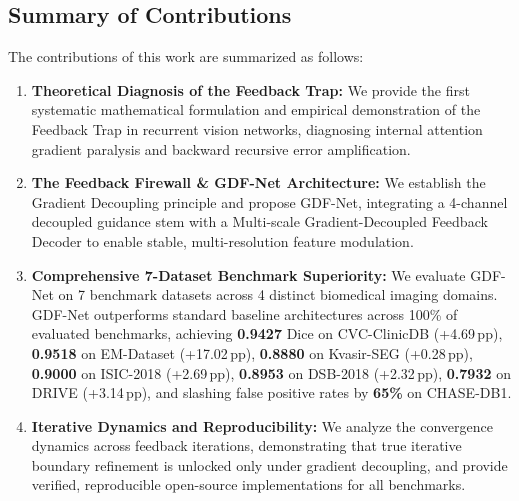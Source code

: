 \subsection{Summary of Contributions}
The contributions of this work are summarized as follows:
\begin{enumerate}
  \item \textbf{Theoretical Diagnosis of the Feedback Trap:} We provide the first systematic mathematical formulation and empirical demonstration of the Feedback Trap in recurrent vision networks, diagnosing internal attention gradient paralysis and backward recursive error amplification.
  \item \textbf{The Feedback Firewall \& GDF-Net Architecture:} We establish the Gradient Decoupling principle and propose GDF-Net, integrating a 4-channel decoupled guidance stem with a Multi-scale Gradient-Decoupled Feedback Decoder to enable stable, multi-resolution feature modulation.
  \item \textbf{Comprehensive 7-Dataset Benchmark Superiority:} We evaluate GDF-Net on 7 benchmark datasets across 4 distinct biomedical imaging domains. GDF-Net outperforms standard baseline architectures across 100\% of evaluated benchmarks, achieving \textbf{0.9427} Dice on CVC-ClinicDB (+4.69\,pp), \textbf{0.9518} on EM-Dataset (+17.02\,pp), \textbf{0.8880} on Kvasir-SEG (+0.28\,pp), \textbf{0.9000} on ISIC-2018 (+2.69\,pp), \textbf{0.8953} on DSB-2018 (+2.32\,pp), \textbf{0.7932} on DRIVE (+3.14\,pp), and slashing false positive rates by \textbf{65\%} on CHASE-DB1.
  \item \textbf{Iterative Dynamics and Reproducibility:} We analyze the convergence dynamics across feedback iterations, demonstrating that true iterative boundary refinement is unlocked only under gradient decoupling, and provide verified, reproducible open-source implementations for all benchmarks.
\end{enumerate}
